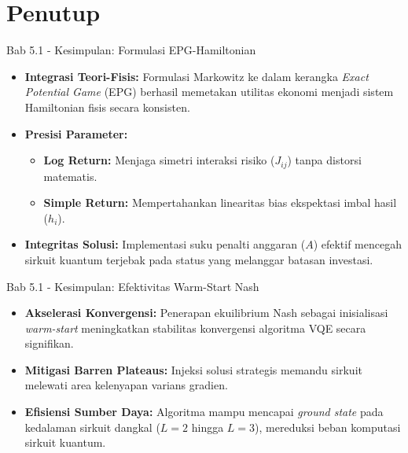 \section{Penutup}

\begin{frame}{Bab 5.1 - Kesimpulan: Formulasi EPG-Hamiltonian}
    \begin{itemize}
        \item \textbf{Integrasi Teori-Fisis:} Formulasi Markowitz ke dalam kerangka \textit{Exact Potential Game} (EPG) berhasil memetakan utilitas ekonomi menjadi sistem Hamiltonian fisis secara konsisten.
        \item \textbf{Presisi Parameter:}
        \begin{itemize}
            \item \textbf{Log Return:} Menjaga simetri interaksi risiko ($J_{ij}$) tanpa distorsi matematis.
            \item \textbf{Simple Return:} Mempertahankan linearitas bias ekspektasi imbal hasil ($h_i$).
        \end{itemize}
        \item \textbf{Integritas Solusi:} Implementasi suku penalti anggaran ($A$) efektif mencegah sirkuit kuantum terjebak pada status yang melanggar batasan investasi.
    \end{itemize}
\end{frame}

\begin{frame}{Bab 5.1 - Kesimpulan: Efektivitas Warm-Start Nash}
    \begin{itemize}
        \item \textbf{Akselerasi Konvergensi:} Penerapan ekuilibrium Nash sebagai inisialisasi \textit{warm-start} meningkatkan stabilitas konvergensi algoritma VQE secara signifikan.
        \item \textbf{Mitigasi Barren Plateaus:} Injeksi solusi strategis memandu sirkuit melewati area kelenyapan varians gradien.
        \item \textbf{Efisiensi Sumber Daya:} Algoritma mampu mencapai \textit{ground state} pada kedalaman sirkuit dangkal ($L=2$ hingga $L=3$), mereduksi beban komputasi sirkuit kuantum.
    \end{itemize}
\end{frame}

